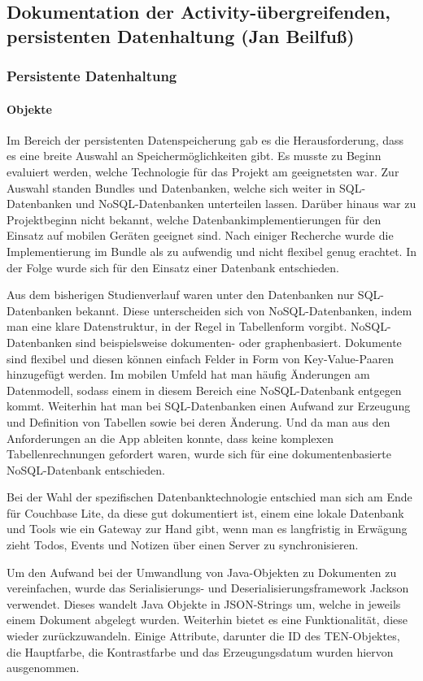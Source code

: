 \subsection{Dokumentation der Activity-übergreifenden, persistenten Datenhaltung (Jan Beilfuß)}
\subsubsection{Persistente Datenhaltung}
\paragraph{Objekte}
Im Bereich der persistenten Datenspeicherung gab es die Herausforderung, dass es eine breite Auswahl an Speichermöglichkeiten gibt. Es musste zu Beginn evaluiert werden, welche Technologie für das Projekt am geeignetsten war. Zur Auswahl standen Bundles und Datenbanken, welche sich weiter in SQL-Datenbanken und NoSQL-Datenbanken unterteilen lassen. Darüber hinaus war zu Projektbeginn nicht bekannt, welche Datenbankimplementierungen für den Einsatz auf mobilen Geräten geeignet sind. Nach einiger Recherche wurde die Implementierung im Bundle als zu aufwendig und nicht flexibel genug erachtet. In der Folge wurde sich für den Einsatz einer Datenbank entschieden.

Aus dem bisherigen Studienverlauf waren unter den Datenbanken nur SQL-Datenbanken bekannt. Diese unterscheiden sich von NoSQL-Datenbanken, indem man eine klare Datenstruktur, in der Regel in Tabellenform vorgibt. NoSQL-Datenbanken sind beispielsweise dokumenten- oder graphenbasiert. Dokumente sind flexibel und diesen können einfach Felder in Form von Key-Value-Paaren hinzugefügt werden. Im mobilen Umfeld hat man häufig Änderungen am Datenmodell, sodass einem in diesem Bereich eine NoSQL-Datenbank entgegen kommt. Weiterhin hat man bei SQL-Datenbanken einen Aufwand zur Erzeugung und Definition von Tabellen sowie bei deren Änderung. Und da man aus den Anforderungen an die App ableiten konnte, dass keine komplexen Tabellenrechnungen gefordert waren, wurde sich für eine dokumentenbasierte NoSQL-Datenbank entschieden.

Bei der Wahl der spezifischen Datenbanktechnologie entschied man sich am Ende für Couchbase Lite, da diese gut dokumentiert ist, einem eine lokale Datenbank und Tools wie ein Gateway zur Hand gibt, wenn man es langfristig in Erwägung zieht Todos, Events und Notizen über einen Server zu synchronisieren.

Um den Aufwand bei der Umwandlung von Java-Objekten zu Dokumenten zu vereinfachen, wurde das Serialisierungs- und Deserialisierungsframework Jackson verwendet. Dieses wandelt Java Objekte in JSON-Strings um, welche in jeweils einem Dokument abgelegt wurden. Weiterhin bietet es eine Funktionalität, diese wieder zurückzuwandeln. Einige Attribute, darunter die ID des TEN-Objektes, die Hauptfarbe, die Kontrastfarbe und das Erzeugungsdatum wurden hiervon ausgenommen.


